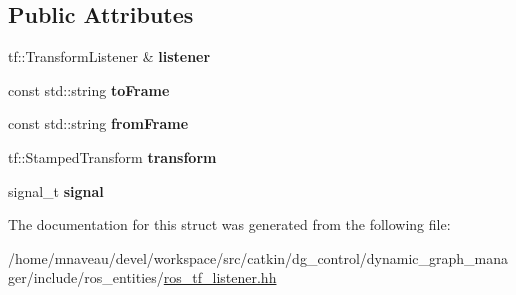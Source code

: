 \subsection*{Public Attributes}
\begin{DoxyCompactItemize}
\item 
tf\+::\+Transform\+Listener \& {\bfseries listener}\hypertarget{structdynamic__graph_1_1internal_1_1TransformListenerData_ae83ed824d8e7350c639d3a4b8f8c7c51}{}\label{structdynamic__graph_1_1internal_1_1TransformListenerData_ae83ed824d8e7350c639d3a4b8f8c7c51}

\item 
const std\+::string {\bfseries to\+Frame}\hypertarget{structdynamic__graph_1_1internal_1_1TransformListenerData_a35c066b704b49bad5319aeefd6955edf}{}\label{structdynamic__graph_1_1internal_1_1TransformListenerData_a35c066b704b49bad5319aeefd6955edf}

\item 
const std\+::string {\bfseries from\+Frame}\hypertarget{structdynamic__graph_1_1internal_1_1TransformListenerData_a95d5dd80a8b2eb36e42515c5e20ea514}{}\label{structdynamic__graph_1_1internal_1_1TransformListenerData_a95d5dd80a8b2eb36e42515c5e20ea514}

\item 
tf\+::\+Stamped\+Transform {\bfseries transform}\hypertarget{structdynamic__graph_1_1internal_1_1TransformListenerData_a79d1956bbae0f50368633551cee1995b}{}\label{structdynamic__graph_1_1internal_1_1TransformListenerData_a79d1956bbae0f50368633551cee1995b}

\item 
signal\+\_\+t {\bfseries signal}\hypertarget{structdynamic__graph_1_1internal_1_1TransformListenerData_aa8e36737907c1f68321dd2535cf11620}{}\label{structdynamic__graph_1_1internal_1_1TransformListenerData_aa8e36737907c1f68321dd2535cf11620}

\end{DoxyCompactItemize}


The documentation for this struct was generated from the following file\+:\begin{DoxyCompactItemize}
\item 
/home/mnaveau/devel/workspace/src/catkin/dg\+\_\+control/dynamic\+\_\+graph\+\_\+manager/include/ros\+\_\+entities/\hyperlink{ros__tf__listener_8hh}{ros\+\_\+tf\+\_\+listener.\+hh}\end{DoxyCompactItemize}
